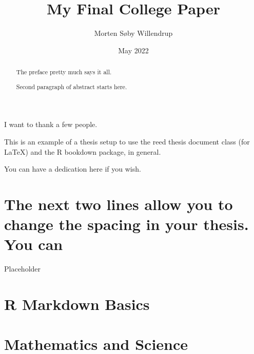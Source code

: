 \documentclass[12pt,twoside]{reedthesis}
\title{My Final College Paper}
\author{Morten Søby Willendrup}
\date{May 2022}
\begin{document}
  \maketitle

\frontmatter %
\pagestyle{empty} %
  \begin{acknowledgements}
    I want to thank a few people.
  \end{acknowledgements}
  \begin{preface}
    This is an example of a thesis setup to use the reed thesis document class
    (for LaTeX) and the R bookdown package, in general.
  \end{preface}
  \hypersetup{linkcolor=black}
  \setcounter{secnumdepth}{2}
  \setcounter{tocdepth}{2}
  \tableofcontents

  \listoftables

  \listoffigures
  \begin{abstract}
    The preface pretty much says it all.

    \par

    Second paragraph of abstract starts here.
  \end{abstract}
  \begin{dedication}
    You can have a dedication here if you wish.
  \end{dedication}
\mainmatter %
\pagestyle{fancyplain} %

\hypertarget{the-next-two-lines-allow-you-to-change-the-spacing-in-your-thesis.-you-can}{%
\chapter{The next two lines allow you to change the spacing in your thesis. You can}\label{the-next-two-lines-allow-you-to-change-the-spacing-in-your-thesis.-you-can}}

Placeholder

\hypertarget{rmd-basics}{%
\chapter{R Markdown Basics}\label{rmd-basics}}

\hypertarget{math-sci}{%
\chapter{Mathematics and Science}\label{math-sci}}
\end{document}
